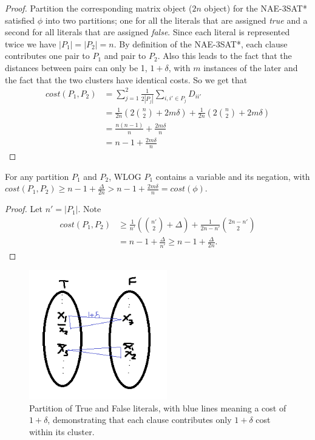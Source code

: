 \begin{proof}
Partition the corresponding matrix object ($2n$ object) for the
NAE-3SAT* satisfied $\phi$ into two partitions; one for all the
literals that are assigned \textit{true} and a second for all literals
that are assigned \textit{false}.  Since each literal is represented
twice we have $|P_1| = |P_2| = n$.   By definition of the NAE-3SAT*,
each clause contributes one pair to $P_1$ and pair to $P_2$.   Also
this leads to the fact that the distances between pairs can only be 1,
$1+\delta$, with $m$ instances of the later and the fact that the two
clusters have identical costs. So we get that 
\begin{align*}
cost(P_1,P_2) &= \sum_{j=1}^{2} \frac{1}{2|P_j|} \sum_{i,i' \in P_j}
D_{ii'}\\ 
&= \frac{1}{2n}( 2 {n \choose 2} + 2m\delta ) + \frac{1}{2n}( 2 {n
  \choose 2} + 2m\delta ) \\ 
&= \frac{ n (n-1) } {n} + \frac{2 m \delta}{n} \\
&= n - 1 +  \frac{2 m \delta}{n}
\end{align*}
\end{proof}

\begin{lemma} \label{different-partitions}
For any partition $P_1$ and $P_2$, WLOG $P_1$ contains a variable and
its negation, with $cost(P_1,P_2) \ge n - 1 + \frac{\Delta}{2n} > n -
1 + \frac{2m\delta}{n} = cost(\phi).$ 
\end{lemma}

\begin{proof}
Let $n' = |P_1|$.  Note
\begin{align*}
cost(P_1,P_2) &\ge \frac{1}{n'}({n' \choose 2} + \Delta ) +
\frac{1}{2n-n'}{2n-n' \choose 2}  \\ 
&= n - 1 + \frac{\Delta}{n'} \ge n-1 +\frac{\Delta}{2n}.
\end{align*}
\end{proof}

\begin{figure}
    \centering
    \includegraphics[width=6cm]{KmeansNAE3SAT.png}
\centering
    \caption{Partition of True and False literals, with blue lines meaning a cost of $1+\delta$, demonstrating that each clause contributes only $1+\delta$ cost within its cluster.}
    \label{fig:my_label}
\end{figure}


